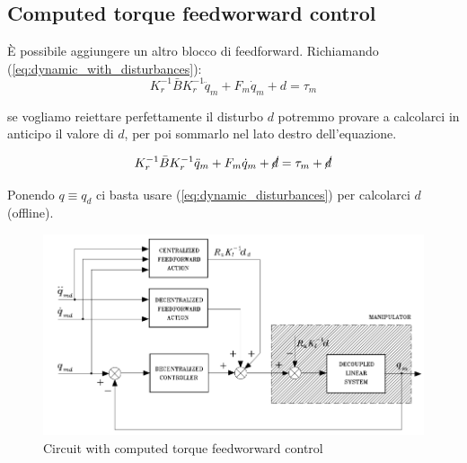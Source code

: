 \subsection{Computed torque	feedworward control}\label{section:computed_torque}
È possibile aggiungere un altro blocco di feedforward.
Richiamando (\ref{eq:dynamic_with_disturbances}):
\boldmath
$$
K_r^{-1}\bar{B}K_r^{-1}\ddot{q}_m + F_m\dot{q}_m + d = \tau_m
$$
\unboldmath

se vogliamo reiettare perfettamente il disturbo $d$ potremmo provare a calcolarci in anticipo il valore di $d$, per poi sommarlo nel lato destro dell'equazione.

\boldmath
$$
K_r^{-1}\bar{B}K_r^{-1}\ddot{q}_m + F_m\dot{q}_m + \cancel{d} = \tau_m + \cancel{d}
$$
\unboldmath

Ponendo $q\equiv q_d$ ci basta usare (\ref{eq:dynamic_disturbances}) per calcolarci $d$ (offline).
 
\begin{figure}[H]
	\centering
	\includegraphics[width=0.7\linewidth]{images/computed_torque}
	\caption{Circuit with computed torque feedworward control}
	\label{fig:computedtorque}
\end{figure}


